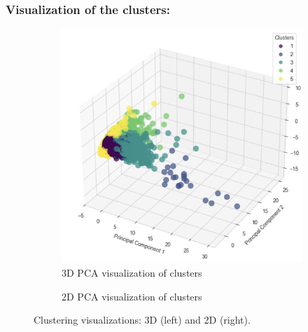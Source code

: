 \subsubsection{Visualization of the clusters:}
\begin{figure}[H]
    \centering
    \begin{subfigure}[b]{0.45\textwidth}
        \centering
        \includegraphics[width=\textwidth]{src/figs/3d_PCA_HC.png}
        \caption{3D PCA visualization of clusters}
        \label{fig:3D_pca}
    \end{subfigure}
    \hfill
    \begin{subfigure}[b]{0.45\textwidth}
        \centering
        \caption{2D PCA visualization of clusters}
        \label{fig:PCA_2d}
    \end{subfigure}
    \caption{Clustering visualizations: 3D (left) and 2D (right).}
    \label{fig:comparison1}
\end{figure}

